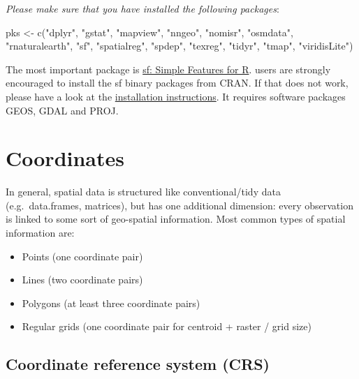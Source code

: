 \documentclass[
  letterpaper,
]{scrbook}
\newenvironment{Shaded}{\begin{snugshade}}{\end{snugshade}}
\newcommand{\FunctionTok}[1]{\textcolor[rgb]{0.28,0.35,0.67}{#1}}
\newcommand{\NormalTok}[1]{\textcolor[rgb]{0.00,0.23,0.31}{#1}}
\newcommand{\OtherTok}[1]{\textcolor[rgb]{0.00,0.23,0.31}{#1}}
\newcommand{\StringTok}[1]{\textcolor[rgb]{0.13,0.47,0.30}{#1}}
\begin{document}
\emph{Please make sure that you have installed the following packages}:

\begin{Shaded}
\begin{Highlighting}[]
\NormalTok{pks }\OtherTok{\textless{}{-}} \FunctionTok{c}\NormalTok{(}\StringTok{"dplyr"}\NormalTok{,}
\StringTok{"gstat"}\NormalTok{,}
\StringTok{"mapview"}\NormalTok{,}
\StringTok{"nngeo"}\NormalTok{,}
\StringTok{"nomisr"}\NormalTok{,}
\StringTok{"osmdata"}\NormalTok{,}
\StringTok{"rnaturalearth"}\NormalTok{,}
\StringTok{"sf"}\NormalTok{,}
\StringTok{"spatialreg"}\NormalTok{,}
\StringTok{"spdep"}\NormalTok{,}
\StringTok{"texreg"}\NormalTok{,}
\StringTok{"tidyr"}\NormalTok{,}
\StringTok{"tmap"}\NormalTok{,}
\StringTok{"viridisLite"}\NormalTok{)}
\end{Highlighting}
\end{Shaded}

The most important package is \href{https://r-spatial.github.io/sf/}{sf:
Simple Features for R}. users are strongly encouraged to install the sf
binary packages from CRAN. If that does not work, please have a look at
the \href{https://r-spatial.github.io/sf/}{installation instructions}.
It requires software packages GEOS, GDAL and PROJ.

\hypertarget{coordinates}{%
\section{Coordinates}\label{coordinates}}

In general, spatial data is structured like conventional/tidy data
(e.g.~data.frames, matrices), but has one additional dimension: every
observation is linked to some sort of geo-spatial information. Most
common types of spatial information are:

\begin{itemize}
\item
  Points (one coordinate pair)
\item
  Lines (two coordinate pairs)
\item
  Polygons (at least three coordinate pairs)
\item
  Regular grids (one coordinate pair for centroid + raster / grid size)
\end{itemize}

\hypertarget{coordinate-reference-system-crs}{%
\subsection{Coordinate reference system
(CRS)}\label{coordinate-reference-system-crs}}
\end{document}

